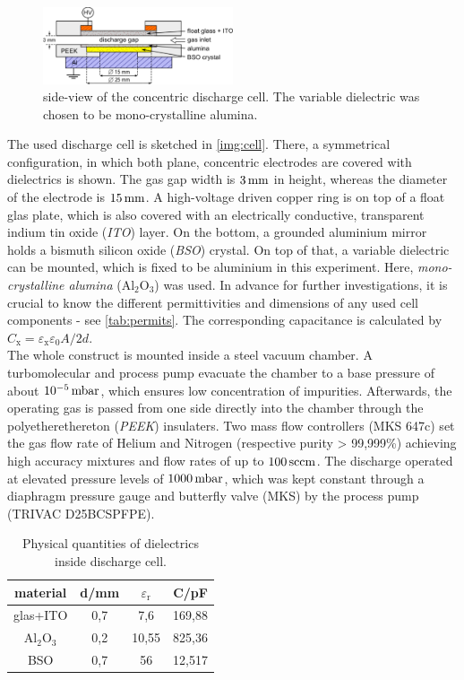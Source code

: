 \documentclass[a4paper,10pt,twoside]{article}
\newcommand{\tenpo}[1]{ 10^{#1}}
\newcommand{\ix}[1]{_\text{#1}}
\newcommand{\tilt}[1]{\textit{#1}}
\begin{document}
				\begin{figure}
					\centering
					\includegraphics[width=0.5\textwidth]{figures/setup/discharge_cell.pdf}
					\caption{side-view of the concentric discharge cell. The variable dielectric was chosen to be mono-crystalline alumina.}
					\label{img:cell}
				\end{figure}
		
			The used discharge cell is sketched in \autoref{img:cell}. There, a symmetrical configuration, in which both plane, concentric electrodes are covered with dielectrics is shown. The gas gap width is $\unit[3]{mm}$ in height, whereas the diameter of the electrode is $\unit[15]{mm}$. A high-voltage driven copper ring is on top of a float glas plate, which is also covered with an electrically conductive, transparent indium tin oxide  (\tilt{ITO}) layer. On the bottom, a grounded aluminium mirror holds a bismuth silicon oxide (\tilt{BSO}) crystal. On top of that, a variable dielectric can be mounted, which is fixed to be aluminium in this experiment. Here, \tilt{mono-crystalline alumina} (Al$_2$O$_3$) was used. In advance for further investigations, it is crucial to know the different permittivities and dimensions of any used cell components - see \autoref{tab:permits}. The corresponding capacitance is calculated by $C\ix{x}=\varepsilon\ix{x}\varepsilon_0 A/2d$.\\
			The whole construct is mounted inside a steel vacuum chamber. A turbomolecular and process pump evacuate the chamber to a base pressure of about $\unit[\tenpo{-5}]{mbar}$, which ensures low concentration of impurities. Afterwards, the operating gas is passed from one side directly into the chamber through the polyetherethereton (\tilt{PEEK}) insulaters. Two mass flow controllers (MKS 647c) set the gas flow rate of Helium and Nitrogen (respective purity > 99,999\%) achieving high accuracy mixtures and flow rates of up to $\unit[100]{sccm}$. The discharge operated at elevated pressure levels of $\unit[1000]{mbar}$, which was kept constant through a diaphragm pressure gauge and butterfly valve (MKS) by the process pump (TRIVAC D25BCSPFPE).
			

				\begin{table}[h]
					\centering
					\begin{tabular}{c|c|c|c}
						material & d/mm & $\varepsilon\ix{r}$ & C/pF \\
						\hline glas+ITO & 0,7 & 7,6 & 169,88\\
						\hline Al$\ix{2}$O$\ix{3}$ & 0,2 & 10,55 & 825,36\\
						\hline BSO & 0,7 & 56 & 12,517 \\
					\end{tabular}
					\caption{Physical quantities of dielectrics inside discharge cell.}
					\label{tab:permits}
				\end{table}
\end{document}
